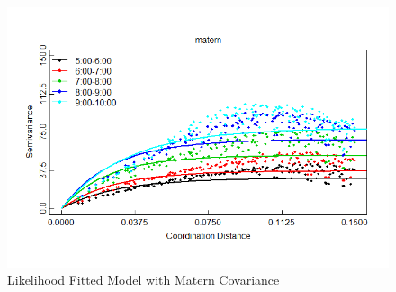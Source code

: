 \documentclass[hidelinks,12pt]{article}
\begin{document}
	\begin{figure}[!ht]
		\includegraphics[width=\textwidth]{lik_matern.png}
		\caption{Likelihood Fitted Model with Matern Covariance \label{fig:likmat}}
	\end{figure}
	

	
	\clearpage
\end{document}
